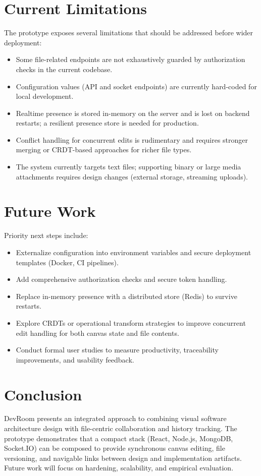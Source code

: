 \documentclass[conference]{IEEEtran}
\begin{document}
\section{Current Limitations}
The prototype exposes several limitations that should be addressed before wider deployment:
\begin{itemize}
\item Some file-related endpoints are not exhaustively guarded by authorization checks in the current codebase.
\item Configuration values (API and socket endpoints) are currently hard-coded for local development.
\item Realtime presence is stored in-memory on the server and is lost on backend restarts; a resilient presence store is needed for production.
\item Conflict handling for concurrent edits is rudimentary and requires stronger merging or CRDT-based approaches for richer file types.
\item The system currently targets text files; supporting binary or large media attachments requires design changes (external storage, streaming uploads).
\end{itemize}

\section{Future Work}
Priority next steps include:
\begin{itemize}
\item Externalize configuration into environment variables and secure deployment templates (Docker, CI pipelines).
\item Add comprehensive authorization checks and secure token handling.
\item Replace in-memory presence with a distributed store (Redis) to survive restarts.
\item Explore CRDTs or operational transform strategies to improve concurrent edit handling for both canvas state and file contents.
\item Conduct formal user studies to measure productivity, traceability improvements, and usability feedback.
\end{itemize}

\section{Conclusion}
DevRoom presents an integrated approach to combining visual software architecture design with file-centric collaboration and history tracking. The prototype demonstrates that a compact stack (React, Node.js, MongoDB, Socket.IO) can be composed to provide synchronous canvas editing, file versioning, and navigable links between design and implementation artifacts. Future work will focus on hardening, scalability, and empirical evaluation.
\end{document}
